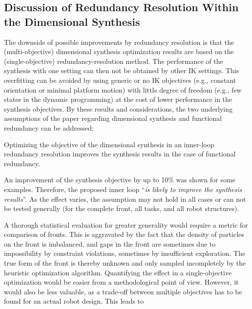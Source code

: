 %
%
%

%
%


\subsection{Discussion of Redundancy Resolution Within the Dimensional Synthesis}
\label{sec:eval_handling_results_taskred_general}

The downside of possible improvements by redundancy resolution is that the (multi-objective) dimensional synthesis optimization results are based on the (single-objective) redundancy-resolution method.
The performance of the synthesis {with one setting} can then not be obtained by other IK settings.
This overfitting can be avoided by using generic or no IK objectives (e.g., constant orientation or minimal platform motion) with little degree of freedom (e.g., few states in the dynamic programming) at the cost of lower performance in the synthesis objectives.
%
%
%
%
By these results and considerations, the two underlying assumptions of the paper regarding dimensional synthesis and functional redundancy can be addressed: %

%
%
%
%
%
%
\begin{Assumption}
  Optimizing the objective of the dimensional synthesis in an inner-loop redundancy resolution improves the synthesis results in the case of functional redundancy.
\end{Assumption}

%
%
An improvement of the synthesis objective by up to 10\% was shown for some examples.
Therefore, the proposed inner loop  ``\emph{is likely to improve the synthesis results}''. 
As the effect varies, the assumption may not hold in all cases or can not be tested generally (for the complete  front, all tasks, and all robot structures).

A thorough statistical evaluation for greater generality would require a metric for comparison of  fronts.
This is aggravated by the fact that the density of particles on the front is imbalanced, and gaps in the front are sometimes due to impossibility by constraint violations, sometimes by insufficient exploration.
The true form of the front is thereby unknown and only sampled incompletely by the heuristic optimization algorithm.
%
Quantifying the effect in a single-objective optimization would be easier from a methodological point of view.
However, it would also be less valuable, as a trade-off between multiple objectives has to be found for an actual robot design.
%
This leads to

